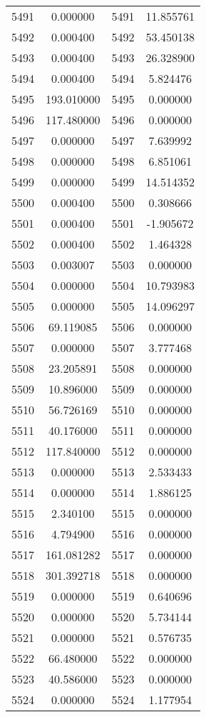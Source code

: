 \documentclass[12pt]{article}
\begin{document}
\begin{longtable}{@{}cccc@{}}
5491 & 0.000000 & 5491 & 11.855761 \\
5492 & 0.000400 & 5492 & 53.450138 \\
5493 & 0.000400 & 5493 & 26.328900 \\
5494 & 0.000400 & 5494 & 5.824476 \\
5495 & 193.010000 & 5495 & 0.000000 \\
5496 & 117.480000 & 5496 & 0.000000 \\
5497 & 0.000000 & 5497 & 7.639992 \\
5498 & 0.000000 & 5498 & 6.851061 \\
5499 & 0.000000 & 5499 & 14.514352 \\
5500 & 0.000400 & 5500 & 0.308666 \\
5501 & 0.000400 & 5501 & -1.905672 \\
5502 & 0.000400 & 5502 & 1.464328 \\
5503 & 0.003007 & 5503 & 0.000000 \\
5504 & 0.000000 & 5504 & 10.793983 \\
5505 & 0.000000 & 5505 & 14.096297 \\
5506 & 69.119085 & 5506 & 0.000000 \\
5507 & 0.000000 & 5507 & 3.777468 \\
5508 & 23.205891 & 5508 & 0.000000 \\
5509 & 10.896000 & 5509 & 0.000000 \\
5510 & 56.726169 & 5510 & 0.000000 \\
5511 & 40.176000 & 5511 & 0.000000 \\
5512 & 117.840000 & 5512 & 0.000000 \\
5513 & 0.000000 & 5513 & 2.533433 \\
5514 & 0.000000 & 5514 & 1.886125 \\
5515 & 2.340100 & 5515 & 0.000000 \\
5516 & 4.794900 & 5516 & 0.000000 \\
5517 & 161.081282 & 5517 & 0.000000 \\
5518 & 301.392718 & 5518 & 0.000000 \\
5519 & 0.000000 & 5519 & 0.640696 \\
5520 & 0.000000 & 5520 & 5.734144 \\
5521 & 0.000000 & 5521 & 0.576735 \\
5522 & 66.480000 & 5522 & 0.000000 \\
5523 & 40.586000 & 5523 & 0.000000 \\
5524 & 0.000000 & 5524 & 1.177954 \\

\end{longtable}
\end{document}

